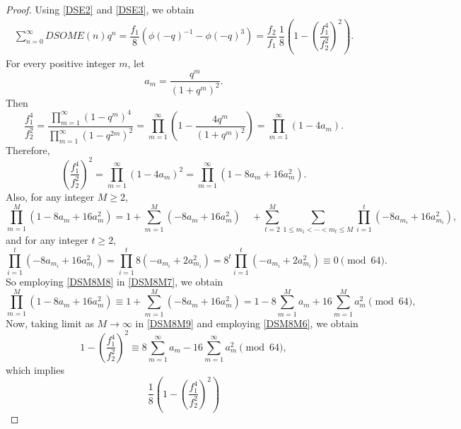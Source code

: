 \documentclass[10pt,a4paper]{amsart}
\begin{document}
\begin{proof}
Using \eqref{DSE2} and \eqref{DSE3}, we obtain
\begin{align}
\sum_{n=0}^{\infty}DSOME(n)q^n
=
\dfrac{f_1}{8}
\left(
\phi(-q)^{-1}-\phi(-q)^3
\right)
=
\dfrac{f_2}{f_1}\,
\dfrac{1}{8}
\left(
1-
\left(
\dfrac{f_1^4}{f_2^2}
\right)^2
\right).
\label{DSM8M3}
\end{align}
For every positive integer $m$, let
\begin{equation}\label{DSM8M4}
a_m=\dfrac{q^m}{(1+q^m)^2}.
\end{equation}
Then
$$\dfrac{f_1^4}{f_2^2}=
\dfrac{\displaystyle\prod_{m=1}^{\infty}(1-q^m)^4}
     {\displaystyle\prod_{m=1}^{\infty}(1-q^{2m})^2}=
\prod_{m=1}^{\infty}
\left(
1-\dfrac{4q^m}{(1+q^m)^2}
\right)=
\prod_{m=1}^{\infty}(1-4a_m).$$
Therefore,
\begin{equation}\label{DSM8M6}
\left(
\dfrac{f_1^4}{f_2^2}
\right)^2=
\prod_{m=1}^{\infty}(1-4a_m)^2=
\prod_{m=1}^{\infty}
\left(
1-8a_m+16a_m^2
\right).
\end{equation}
Also, for any  integer $M\geq2$, 
\begin{equation}\label{DSM8M7}
\prod_{m=1}^{M}
\left(
1-8a_m+16a_m^2
\right)
=
1+
\sum_{m=1}^{M}
\left(
-8a_m+16a_m^2
\right)\quad+
\sum_{t=2}^{M}
\sum_{1\leq m_1<\cdots<m_t\leq M}
\prod_{i=1}^{t}
\left(
-8a_{m_i}+16a_{m_i}^2
\right),
\end{equation} and for any integer 
 $t\geq2$, 
\begin{equation}\label{DSM8M8}
\prod_{i=1}^{t}
\left(
-8a_{m_i}+16a_{m_i}^2
\right)=
\prod_{i=1}^{t}
8\left(
-a_{m_i}+2a_{m_i}^2
\right)
=
8^t
\prod_{i=1}^{t}
\left(
-a_{m_i}+2a_{m_i}^2
\right)
\equiv0\pmod{64}.
\end{equation}
So employing \eqref{DSM8M8} in \eqref{DSM8M7}, we obtain
\begin{equation}\label{DSM8M9}
\prod_{m=1}^{M}
\left(
1-8a_m+16a_m^2
\right)
\equiv
1+
\sum_{m=1}^{M}
\left(
-8a_m+16a_m^2
\right)
=
1-8\sum_{m=1}^{M}a_m
+16\sum_{m=1}^{M}a_m^2
\pmod{64},
\end{equation}
Now, taking limit as
$M\rightarrow\infty$ in \eqref{DSM8M9} and employing
\eqref{DSM8M6}, we obtain
\begin{equation*}
1-
\left(
\dfrac{f_1^4}{f_2^2}
\right)^2
\equiv
8\sum_{m=1}^{\infty}a_m
-16\sum_{m=1}^{\infty}a_m^2
\pmod{64},
\end{equation*}
which implies
\begin{equation}\label{DSM8M11}
\dfrac{1}{8}
\left(
1-
\left(
\dfrac{f_1^4}{f_2^2}
\right)^2
\right)

\end{equation}
\end{proof}
\end{document}
